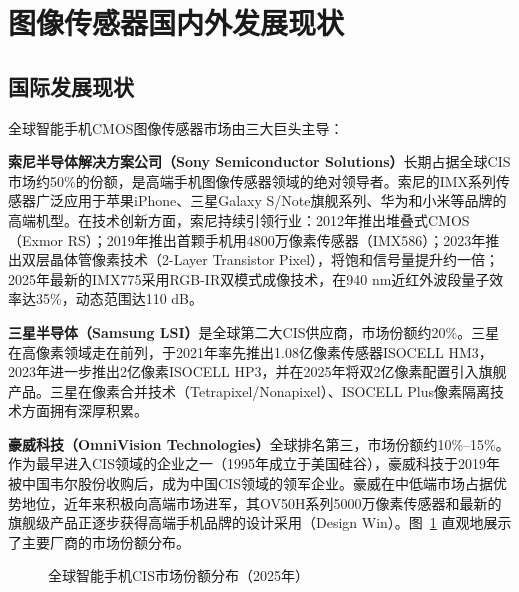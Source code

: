 \documentclass[12pt, a4paper]{ctexart}
\begin{document}
\section{图像传感器国内外发展现状}

\subsection{国际发展现状}

全球智能手机CMOS图像传感器市场由三大巨头主导：

\textbf{索尼半导体解决方案公司（Sony Semiconductor Solutions）}长期占据全球CIS市场约50\%的份额，是高端手机图像传感器领域的绝对领导者\cite{yole2025}。索尼的IMX系列传感器广泛应用于苹果iPhone、三星Galaxy S/Note旗舰系列、华为和小米等品牌的高端机型。在技术创新方面，索尼持续引领行业：2012年推出堆叠式CMOS（Exmor RS）；2019年推出首颗手机用4800万像素传感器（IMX586）；2023年推出双层晶体管像素技术（2-Layer Transistor Pixel），将饱和信号量提升约一倍；2025年最新的IMX775采用RGB-IR双模式成像技术，在940 nm近红外波段量子效率达35\%，动态范围达110 dB\cite{statsmarket2026}。

\textbf{三星半导体（Samsung LSI）}是全球第二大CIS供应商，市场份额约20\%。三星在高像素领域走在前列，于2021年率先推出1.08亿像素传感器ISOCELL HM3，2023年进一步推出2亿像素ISOCELL HP3，并在2025年将双2亿像素配置引入旗舰产品\cite{adhocnews2025}。三星在像素合并技术（Tetrapixel/Nonapixel）、ISOCELL Plus像素隔离技术方面拥有深厚积累。

\textbf{豪威科技（OmniVision Technologies）}全球排名第三，市场份额约10\%--15\%。作为最早进入CIS领域的企业之一（1995年成立于美国硅谷），豪威科技于2019年被中国韦尔股份收购后，成为中国CIS领域的领军企业。豪威在中低端市场占据优势地位，近年来积极向高端市场进军，其OV50H系列5000万像素传感器和最新的旗舰级产品正逐步获得高端手机品牌的设计采用（Design Win）\cite{adhocnews2025}。图~\ref{fig:market_share} 直观地展示了主要厂商的市场份额分布。

\begin{figure}[H]
\centering
{}
\caption{全球智能手机CIS市场份额分布（2025年）\cite{statsmarket2026}}
\label{fig:market_share}
\end{figure}
\end{document}
